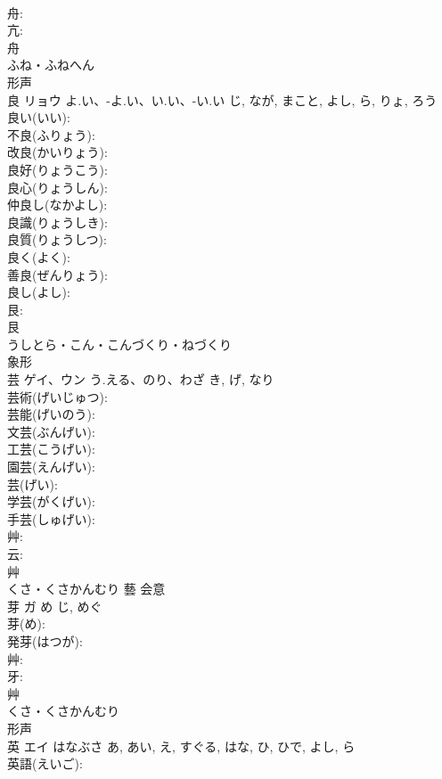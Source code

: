 \documentclass[8pt]{extreport}
\begin{document}
\begin{CJK}{UTF8}{min}
\\	舟: 
\\	亢: 
\\	舟	
\\	ふね・ふねへん	
\\	形声 
\\	良	リョウ	よ.い、-よ.い、い.い、-い.い	じ, なが, まこと, よし, ら, りょ, ろう	
\\	良い(いい): 
\\	不良(ふりょう): 
\\	改良(かいりょう): 
\\	良好(りょうこう): 
\\	良心(りょうしん): 
\\	仲良し(なかよし): 
\\	良識(りょうしき): 
\\	良質(りょうしつ): 
\\	良く(よく): 
\\	善良(ぜんりょう): 
\\	良し(よし): 
\\	艮: 
\\	艮	
\\	うしとら・こん・こんづくり・ねづくり	
\\	象形 
\\	芸	ゲイ、ウン	う.える、のり、わざ	き, げ, なり	
\\	芸術(げいじゅつ): 
\\	芸能(げいのう): 
\\	文芸(ぶんげい): 
\\	工芸(こうげい): 
\\	園芸(えんげい): 
\\	芸(げい): 
\\	学芸(がくげい): 
\\	手芸(しゅげい): 
\\	艸: 
\\	云: 
\\	艸	
\\	くさ・くさかんむり	藝	会意 
\\	芽	ガ	め	じ, めぐ	
\\	芽(め): 
\\	発芽(はつが): 
\\	艸: 
\\	牙: 
\\	艸	
\\	くさ・くさかんむり	
\\	形声 
\\	英	エイ	はなぶさ	あ, あい, え, すぐる, はな, ひ, ひで, よし, ら	
\\	英語(えいご): 

\end{CJK}
\end{document}
